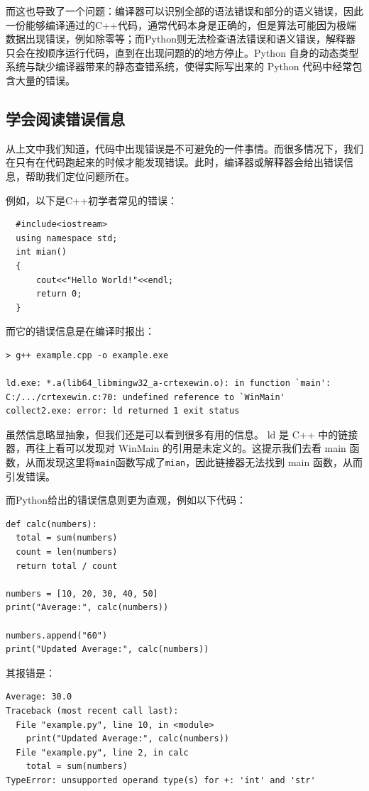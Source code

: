 \documentclass[../main.tex]{subfiles}
\begin{document}
而这也导致了一个问题：编译器可以识别全部的语法错误和部分的语义错误，因此一份能够编译通过的C++代码，通常代码本身是正确的，但是算法可能因为极端数据出现错误，例如除零等；而Python则无法检查语法错误和语义错误，解释器只会在按顺序运行代码，直到在出现问题的的地方停止。Python 自身的动态类型系统与缺少编译器带来的静态查错系统，使得实际写出来的 Python 代码中经常包含大量的错误。

\subsection{学会阅读错误信息}

从上文中我们知道，代码中出现错误是不可避免的一件事情。而很多情况下，我们在只有在代码跑起来的时候才能发现错误。此时，编译器或解释器会给出错误信息，帮助我们定位问题所在。

例如，以下是C++初学者常见的错误：

\begin{verbatim}
  #include<iostream>
  using namespace std;
  int mian()
  {
      cout<<"Hello World!"<<endl;
      return 0;
  }
\end{verbatim}

而它的错误信息是在编译时报出：

\begin{verbatim}
> g++ example.cpp -o example.exe

ld.exe: *.a(lib64_libmingw32_a-crtexewin.o): in function `main':
C:/.../crtexewin.c:70: undefined reference to `WinMain'
collect2.exe: error: ld returned 1 exit status
\end{verbatim}

虽然信息略显抽象，但我们还是可以看到很多有用的信息。 ld 是 C++ 中的链接器，再往上看可以发现对 WinMain 的引用是未定义的。这提示我们去看 main 函数，从而发现这里将\texttt{main}函数写成了\texttt{mian}，因此链接器无法找到 main 函数，从而引发错误。

而Python给出的错误信息则更为直观，例如以下代码：

\begin{verbatim}
def calc(numbers):
  total = sum(numbers)
  count = len(numbers)
  return total / count

numbers = [10, 20, 30, 40, 50]
print("Average:", calc(numbers))

numbers.append("60")
print("Updated Average:", calc(numbers))
\end{verbatim}

其报错是：
\begin{verbatim}
Average: 30.0
Traceback (most recent call last):
  File "example.py", line 10, in <module>
    print("Updated Average:", calc(numbers))
  File "example.py", line 2, in calc
    total = sum(numbers)
TypeError: unsupported operand type(s) for +: 'int' and 'str'
\end{verbatim}
\end{document}
